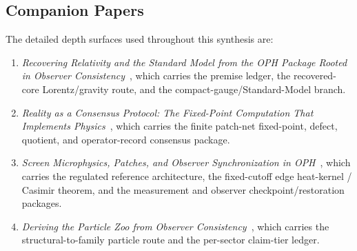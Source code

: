 \documentclass[11pt]{article}
\begin{document}
\subsection*{Companion Papers}

The detailed depth surfaces used throughout this synthesis are:
\begin{enumerate}[leftmargin=2em]
\item \emph{Recovering Relativity and the Standard Model from the OPH Package Rooted in Observer Consistency}~\cite{ophcompact}, which carries the premise ledger, the recovered-core Lorentz/gravity route, and the compact-gauge/Standard-Model branch.
\item \emph{Reality as a Consensus Protocol: The Fixed-Point Computation That Implements Physics}~\cite{ophconsensus}, which carries the finite patch-net fixed-point, defect, quotient, and operator-record consensus package.
\item \emph{Screen Microphysics, Patches, and Observer Synchronization in OPH}~\cite{ophmicrophysics}, which carries the regulated reference architecture, the fixed-cutoff edge heat-kernel / Casimir theorem, and the measurement and observer checkpoint/restoration packages.
\item \emph{Deriving the Particle Zoo from Observer Consistency}~\cite{ophparticles}, which carries the structural-to-family particle route and the per-sector claim-tier ledger.
\end{enumerate}

\def\OPHSkipEmbeddedReferences{1}



\appendix


\end{document}
